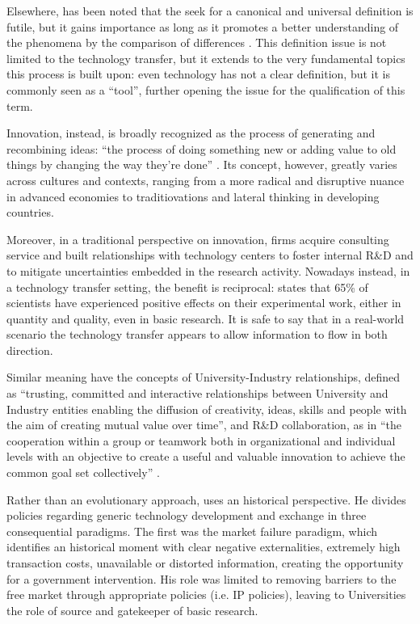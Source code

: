 Elsewhere, has been noted that the seek for a canonical and universal definition is futile, but it gains importance as long as it promotes a better understanding of the phenomena by the comparison of differences \citep{Bozeman2000}. This definition issue is not limited to the technology transfer, but it extends to the very fundamental topics this process is built upon: even technology has not a clear definition, but it is commonly seen as a \enquote{tool}, further opening the issue for the qualification of this term. 

Innovation, instead, is broadly recognized as the process of generating and recombining ideas: \enquote{the process of doing something new or adding value to old things by changing the way they're done} \citep{Baskaran2016}. Its concept, however, greatly varies across cultures and contexts, ranging from a more radical and disruptive nuance in advanced economies to traditiovations and lateral thinking in developing countries.

Moreover, in a traditional perspective on innovation, firms acquire consulting service and built relationships with technology centers to foster internal R\&D and to mitigate uncertainties embedded in the research activity. Nowadays instead, in a technology transfer setting, the benefit is reciprocal: \citet{Siegel2003a} states that 65\% of scientists have experienced positive effects on their experimental work, either in quantity and quality, even in basic research. It is safe to say that in a real-world scenario the technology transfer appears to allow information to flow in both direction.

Similar meaning have the concepts of University-Industry relationships, defined as \enquote{trusting, committed and interactive relationships between University and Industry entities enabling the diffusion of creativity, ideas, skills and people with the aim of creating mutual value over time}, and R\&D collaboration, as in \enquote{the cooperation within a group or teamwork both in organizational and individual levels with an objective to create a useful and valuable innovation to achieve the common goal set collectively} \citep{Frasquet2012}. 

Rather than an evolutionary approach, \citet{Bozeman2000} uses an historical perspective. He divides policies regarding generic technology development and exchange in three consequential paradigms. The first was the market failure paradigm, which identifies an historical moment with clear negative externalities, extremely high transaction costs, unavailable or distorted information, creating the opportunity for a government intervention. His role was limited to removing barriers to the free market through appropriate policies (i.e. IP policies), leaving to Universities the role of source and gatekeeper of basic research.

